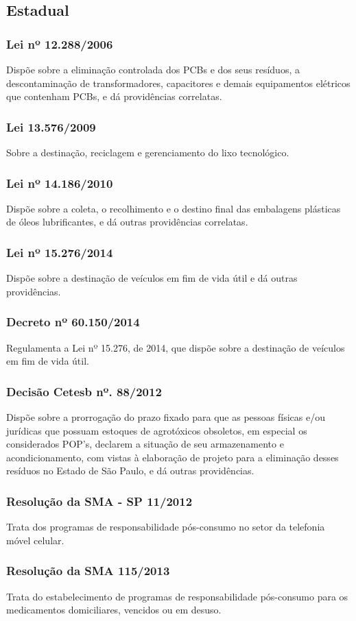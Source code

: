 \begin{subapend}
	\subsection{Estadual}
	\begin{subsubapend}
		\item \subsubsection{Lei nº 12.288/2006}
		Dispõe sobre a eliminação controlada dos PCBs e dos seus resíduos, a descontaminação de transformadores, capacitores e demais equipamentos elétricos que contenham PCBs, e dá providências correlatas.
		\subsubsection{Lei 13.576/2009}
		Sobre a destinação, reciclagem e gerenciamento do lixo tecnológico.
		\subsubsection{Lei nº 14.186/2010}
		Dispõe sobre a coleta, o recolhimento e o destino final das embalagens plásticas de óleos lubrificantes, e dá outras providências correlatas.
		\subsubsection{Lei nº 15.276/2014}
		Dispõe sobre a destinação de veículos em fim de vida útil e dá outras providências.
		\subsubsection{Decreto nº 60.150/2014}
		Regulamenta a Lei nº 15.276, de 2014, que dispõe sobre a destinação de veículos em fim de vida útil.
		\subsubsection{Decisão Cetesb nº. 88/2012}
		Dispõe sobre a prorrogação do prazo fixado para que as pessoas físicas e/ou jurídicas que possuam estoques de agrotóxicos obsoletos, em especial os considerados POP's, declarem a situação de seu armazenamento e acondicionamento, com vistas à elaboração de projeto para a eliminação desses resíduos no Estado de São Paulo, e dá outras providências.
		\subsubsection{Resolução da SMA - SP 11/2012}
		Trata dos programas de responsabilidade pós-consumo no setor da telefonia móvel celular.
		\subsubsection{Resolução da SMA 115/2013}
		Trata do estabelecimento de programas de responsabilidade pós-consumo para os medicamentos domiciliares, vencidos ou em desuso.
	\end{subsubapend}
\end{subapend}	


